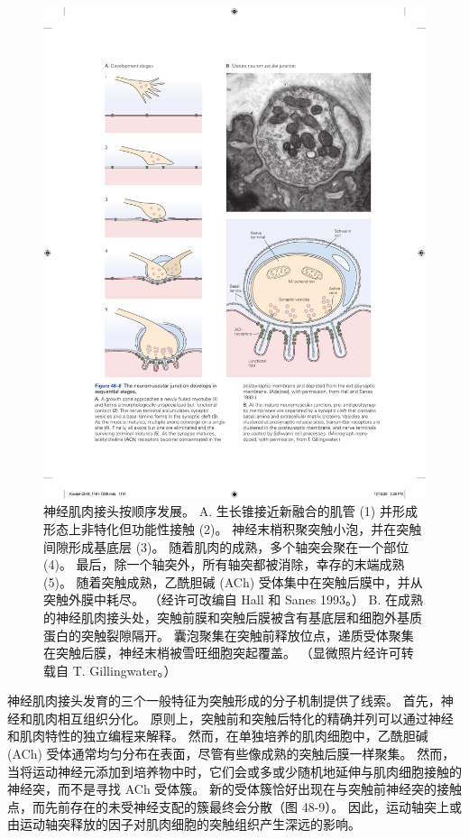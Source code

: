 \begin{figure}[htbp]
	\centering
	\includegraphics[width=0.9\linewidth]{chap48/fig_48_8}
	\caption{神经肌肉接头按顺序发展。 A. 生长锥接近新融合的肌管 (1) 并形成形态上非特化但功能性接触 (2)。 神经末梢积聚突触小泡，并在突触间隙形成基底层 (3)。 随着肌肉的成熟，多个轴突会聚在一个部位 (4)。 最后，除一个轴突外，所有轴突都被消除，幸存的末端成熟 (5)。 随着突触成熟，乙酰胆碱 (ACh) 受体集中在突触后膜中，并从突触外膜中耗尽。 （经许可改编自 Hall 和 Sanes 1993。） B. 在成熟的神经肌肉接头处，突触前膜和突触后膜被含有基底层和细胞外基质蛋白的突触裂隙隔开。 囊泡聚集在突触前释放位点，递质受体聚集在突触后膜，神经末梢被雪旺细胞突起覆盖。 （显微照片经许可转载自 T. Gillingwater。）}
	\label{fig:48_8}
\end{figure}

神经肌肉接头发育的三个一般特征为突触形成的分子机制提供了线索。 首先，神经和肌肉相互组织分化。 原则上，突触前和突触后特化的精确并列可以通过神经和肌肉特性的独立编程来解释。 然而，在单独培养的肌肉细胞中，乙酰胆碱 (ACh) 受体通常均匀分布在表面，尽管有些像成熟的突触后膜一样聚集。 然而，当将运动神经元添加到培养物中时，它们会或多或少随机地延伸与肌肉细胞接触的神经突，而不是寻找 ACh 受体簇。 
新的受体簇恰好出现在与突触前神经突的接触点，而先前存在的未受神经支配的簇最终会分散（图 48-9）。 
因此，运动轴突上或由运动轴突释放的因子对肌肉细胞的突触组织产生深远的影响。

